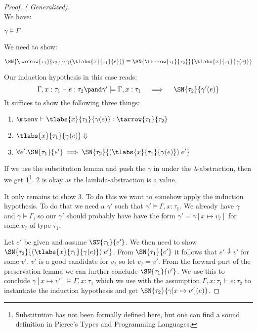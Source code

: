 \begin{proof}[Proof. ( Generalized)]
\case{\TAbs} \\
We have: 
\begin{description}
  \item $\gamma \models \Gamma$
\end{description}
We need to show:
\begin{description}
  \item $\SN{\tarrow{\tau_1}{\tau_2}}{\gamma(\tlabs{x}{\tau_1}{e})} \equiv \SN{\tarrow{\tau_1}{\tau_2}}{\tlabs{x}{\tau_1}{\gamma(e)}}$
\end{description}
Our induction hypothesis in this case reads:
\[
  \Gamma,x:\tau_1 \vdash e : \tau_2 \pand \gamma' \models \Gamma, x : \tau_1 \quad \implies \quad \SN{\tau_2}{\gamma'(e)}
\]
It suffices to show the following three things:
\begin{enumerate}
\item $\mtenv \vdash \tlabs{x}{\tau_1}{\gamma(e)} : \tarrow{\tau_1}{\tau_2}$
\item $\tlabs{x}{\tau_1}{\gamma(e)} \Downarrow$
\item $\forall e'. \SN{\tau_1}{e'} \implies \SN{\tau_2}{(\tlabs{x}{\tau_1}{\gamma(e)}) \; e'}$
\end{enumerate}
If we use the substitution lemma and push the $\gamma$ in under the $\lambda$-abstraction, then we get 1\footnote{Substitution has not been formally defined here, but one can find a sound definition in Pierce's Types and Programming Languages.}. 2 is okay as the lambda-abstraction is a value. 

It only remains to show 3. To do this we want to somehow apply the induction hypothesis. To do that we need a $\gamma'$ such that $\gamma' \models \Gamma, x:\tau_1$. We already have $\gamma$ and $\gamma \models \Gamma$, so our $\gamma'$ should probably have have the form $\gamma' = \gamma[x \mapsto v_?]$ for some $v_?$ of type $\tau_1$.

Let $e'$ be given and assume $\SN{\tau_1}{e'}$. We then need to show $\SN{\tau_2}{(\tlabs{x}{\tau_1}{\gamma(e)}) \; e'}$. From $\SN{\tau_1}{e'}$ it follows that $e' \Downarrow v'$ for some $v'$. $v'$ is a good candidate for $v_?$ so let $v_? = v'$. From the forward part of the preservation lemma we can further conclude $\SN{\tau_1}{v'}$. We use this to conclude $\gamma[x\mapsto v'] \models \Gamma, x:\tau_1$ which we use with the assumption $\Gamma,x:\tau_1 \vdash e : \tau_2$ to instantiate the induction hypothesis and get $\SN{\tau_2}{\gamma[x\mapsto v'](e)}$.


\end{proof}
